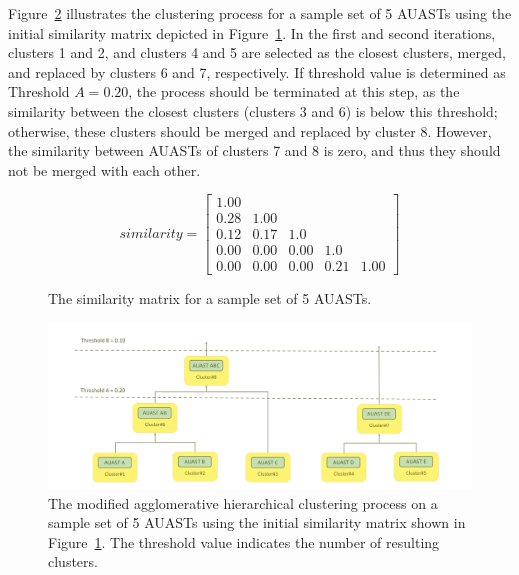 Figure~\ref{fig:overview2} illustrates the clustering process for a sample set of 5 AUASTs using the initial similarity matrix depicted in Figure~\ref{matrix}. In the first and second iterations, clusters 1 and 2, and clusters 4 and 5 are selected as the closest clusters, merged, and replaced by clusters 6 and 7, respectively. If threshold value is determined as Threshold $A = 0.20$, the process should be terminated at this step, as the similarity between the closest clusters (clusters 3 and 6) is below this threshold; otherwise, these clusters should be merged and replaced by cluster 8. However, the similarity between AUASTs of clusters 7 and 8 is zero, and thus they should not be merged with each other. 



\begin{figure} [H]
\begin{displaymath}
    similarity = \left[
        \begin{matrix}
        1.00 &  &  &  &   \\
0.28 & 1.00 &  &  &  \\
0.12 & 0.17 & 1.0 &  &  \\
0.00 & 0.00 & 0.00 & 1.0 &  \\
0.00 & 0.00 & 0.00 & 0.21 & 1.00
        \end{matrix}   \right]
\end{displaymath}
 \caption{The similarity matrix for a sample set of 5 AUASTs.}
  \label{matrix}
\end{figure}




\begin{figure} [p]
  \centering\includegraphics [width = \textwidth]{Drawing4/overview2.pdf}
  \caption{The modified agglomerative hierarchical clustering process on a sample set of  5 AUASTs using the initial similarity matrix shown in Figure~\ref{matrix}. The threshold value indicates the number of resulting clusters.}
  \label{fig:overview2}
\end{figure}

